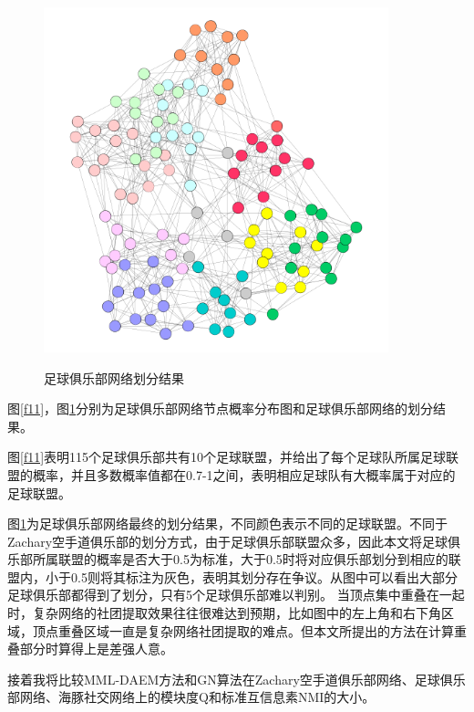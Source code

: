 \documentclass[a4paper,12pt,openany,oneside,utf-8]{ctexbook}
\begin{document}
	\begin{figure}[H]
	\centering
	\includegraphics[width=100mm,height=100mm]{figure/football.png}\\
	\caption{足球俱乐部网络划分结果}\label{f12}
    \end{figure}
	
	图\ref{f11}，图\ref{f12}分别为足球俱乐部网络节点概率分布图和足球俱乐部网络的划分结果。
	
	图\ref{f11}表明115个足球俱乐部共有10个足球联盟，并给出了每个足球队所属足球联盟的概率，并且多数概率值都在0.7-1之间，表明相应足球队有大概率属于对应的足球联盟。
	
	图\ref{f12}为足球俱乐部网络最终的划分结果，不同颜色表示不同的足球联盟。不同于Zachary空手道俱乐部的划分方式，由于足球俱乐部联盟众多，因此本文将足球俱乐部所属联盟的概率是否大于0.5为标准，大于0.5时将对应俱乐部划分到相应的联盟内，小于0.5则将其标注为灰色，表明其划分存在争议。从图中可以看出大部分足球俱乐部都得到了划分，只有5个足球俱乐部难以判别。
	当顶点集中重叠在一起时，复杂网络的社团提取效果往往很难达到预期，比如图中的左上角和右下角区域，顶点重叠区域一直是复杂网络社团提取的难点。但本文所提出的方法在计算重叠部分时算得上是差强人意。
	
	接着我将比较MML-DAEM方法和GN\cite{ref8}算法在Zachary空手道俱乐部网络、足球俱乐部网络、海豚社交网络上的模块度Q和标准互信息素NMI的大小。
	
\end{document}
